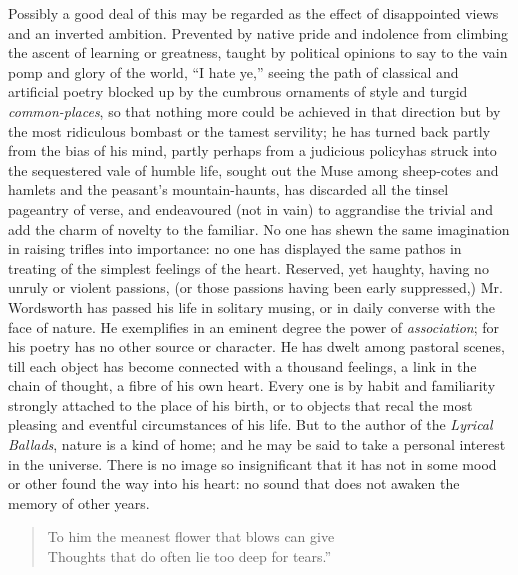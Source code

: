 Possibly a good deal of this may be regarded as the effect of
disappointed views and an inverted ambition. Prevented by native
pride and indolence from climbing the ascent of learning or
greatness, taught by political opinions to say to the vain pomp
and glory of the world, ``I hate ye,'' seeing the path of
classical and artificial poetry blocked up by the cumbrous
ornaments of style and turgid \emph{common-places}, so that
nothing more could be achieved in that direction but by the most
ridiculous bombast or the tamest servility; he has turned back
partly from the bias of his mind, partly perhaps from a judicious
policy\textemdash has struck into the sequestered vale of humble
life, sought out the Muse among sheep-cotes and hamlets and the
peasant's mountain-haunts, has discarded all the tinsel pageantry
of verse, and endeavoured (not in vain) to aggrandise the trivial
and add the charm of novelty to the familiar. No one has shewn the
same imagination in raising trifles into importance: no one has
displayed the same pathos in treating of the simplest feelings of
the heart. Reserved, yet haughty, having no unruly or violent
passions, (or those passions having been early suppressed,)
Mr. Wordsworth has passed his life in solitary musing, or in daily
converse with the face of nature. He exemplifies in an eminent
degree the power of \emph{association}; for his poetry has no
other source or character. He has dwelt among pastoral scenes,
till each object has become connected with a thousand feelings, a
link in the chain of thought, a fibre of his own heart. Every one
is by habit and familiarity strongly attached to the place of his
birth, or to objects that recal the most pleasing and eventful
circumstances of his life. But to the author of the \emph{Lyrical
Ballads}, nature is a kind of home; and he may be said to take a
personal interest in the universe. There is no image so
insignificant that it has not in some mood or other found the way
into his heart: no sound that does not awaken the memory of other
years.\textemdash
\begin{verse} To him the meanest flower that blows
can give \\ Thoughts that do often lie too deep for tears.''
\end{verse} 
